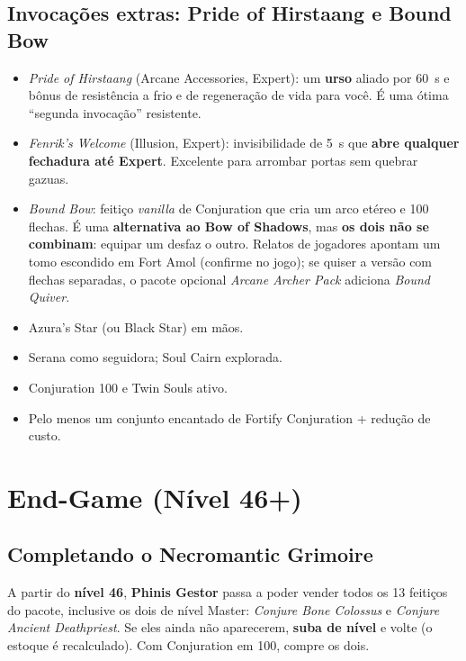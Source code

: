 \documentclass[11pt,a4paper,oneside,openany]{book}
\newcommand{\magia}[1]{\textit{\textcolor{SoulCairnPurple}{#1}}}
\newcommand{\npc}[1]{\textbf{#1}}
\begin{document}
\section{Invocações extras: Pride of Hirstaang e Bound Bow}
\begin{itemize}
  \item \magia{Pride of Hirstaang} (Arcane Accessories, Expert): um \textbf{urso} aliado por 60~s e bônus de resistência a frio e de regeneração de vida para você. É uma ótima ``segunda invocação'' resistente.
  \item \magia{Fenrik's Welcome} (Illusion, Expert): invisibilidade de 5~s que \textbf{abre qualquer fechadura até Expert}. Excelente para arrombar portas sem quebrar gazuas.
  \item \magia{Bound Bow}: feitiço \emph{vanilla} de Conjuration que cria um arco etéreo e 100 flechas. É uma \textbf{alternativa ao Bow of Shadows}, mas \textbf{os dois não se combinam}: equipar um desfaz o outro. Relatos de jogadores apontam um tomo escondido em Fort Amol (confirme no jogo); se quiser a versão com flechas separadas, o pacote opcional \emph{Arcane Archer Pack} adiciona \magia{Bound Quiver}.
\end{itemize}

\begin{checkpoint}
\begin{itemize}
  \item Azura's Star (ou Black Star) em mãos.
  \item Serana como seguidora; Soul Cairn explorada.
  \item Conjuration 100 e Twin Souls ativo.
  \item Pelo menos um conjunto encantado de Fortify Conjuration + redução de custo.
\end{itemize}
\end{checkpoint}

\chapter{End-Game (Nível 46+)}

\section{Completando o Necromantic Grimoire}
A partir do \textbf{nível 46}, \npc{Phinis Gestor} passa a poder vender todos os 13 feitiços do pacote, inclusive os dois de nível Master: \magia{Conjure Bone Colossus} e \magia{Conjure Ancient Deathpriest}. Se eles ainda não aparecerem, \textbf{suba de nível} e volte (o estoque é recalculado). Com Conjuration em 100, compre os dois.
\end{document}
